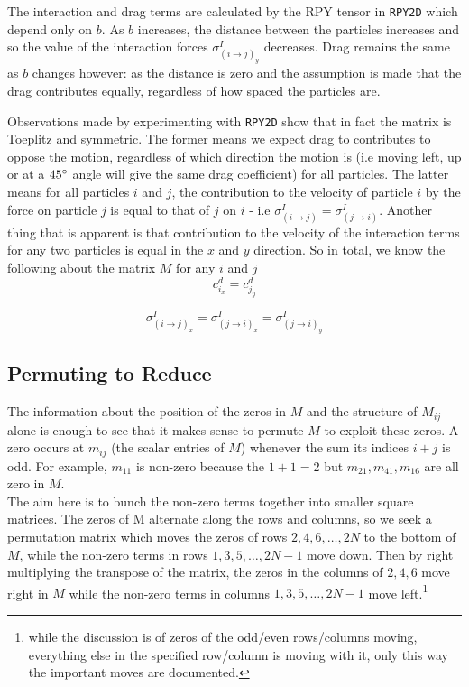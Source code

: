 \documentclass[paper=a4, fontsize=12pt]{scrartcl} %
\numberwithin{equation}{section}       %
\numberwithin{figure}{section}         %
\numberwithin{table}{section}          %
\begin{document}
\noindent The interaction and drag terms are calculated by the RPY tensor in \texttt{RPY2D} which depend only on $b$. As $b$ increases, the distance between the particles increases and so the value of the interaction forces $\sigma^I_{(i\rightarrow j)_{y}}$ decreases. Drag remains the same as $b$ changes however: as the distance is zero and the assumption is made that the drag contributes equally, regardless of how spaced the particles are.

\noindent Observations made by experimenting with \texttt{RPY2D} show that in fact the matrix is Toeplitz and symmetric. The former means we expect drag to contributes to oppose the motion, regardless of which direction the motion is (i.e moving left, up or at a $45\degree$ angle will give the same drag coefficient) for all particles. The latter means for all particles $i$ and $j$, the contribution to the velocity of particle $i$ by the force on particle $j$ is equal to that of $j$ on $i$ - i.e $\sigma^I_{(i\rightarrow j)} = \sigma^I_{(j\rightarrow i)}$. Another thing that is apparent is that contribution to the velocity of the interaction terms for any two particles is equal in the $x$ and $y$ direction. So in total, we know the following about the matrix $M$ for any $i$ and $j$ 
\begin{equation}
 c^d_{i_{x}} = c^d_{j_{y}}
\end{equation}

\begin{equation}
\sigma^I_{(i\rightarrow j)_{x}} = \sigma^I_{(j\rightarrow i)_{x}} = \sigma^I_{(j\rightarrow i)_{y}}
\end{equation}

\subsection{Permuting to Reduce} 
The information about the position of the zeros in $M$ and the structure of $M_{ij}$ alone is enough to see that it makes sense to permute $M$ to exploit these zeros. A zero occurs at $m_{ij}$ (the scalar entries of $M$) whenever the sum its indices $i+j$ is odd. For example, $m_{11}$ is non-zero because the $1+1=2$ but  $m_{21}, m_{41},m_{16}$ are all zero in $M$. \\

\noindent The aim here is to bunch the non-zero terms together into smaller square matrices. The zeros of M alternate along the rows and columns, so we seek a permutation matrix which moves the zeros of rows $2,4,6,\dots,2N$ to the bottom of $M$, while the non-zero terms in rows $1,3,5,\dots,2N-1$ move down. Then by right multiplying the transpose of the matrix, the zeros in the columns of $2,4,6$ move right in $M$ while the non-zero terms in columns $1,3,5,\dots,2N-1$ move left.\footnote{while the discussion is of zeros of the odd/even rows/columns moving, everything else in the specified row/column is moving with it, only this way the important moves are documented.} 
\end{document}
